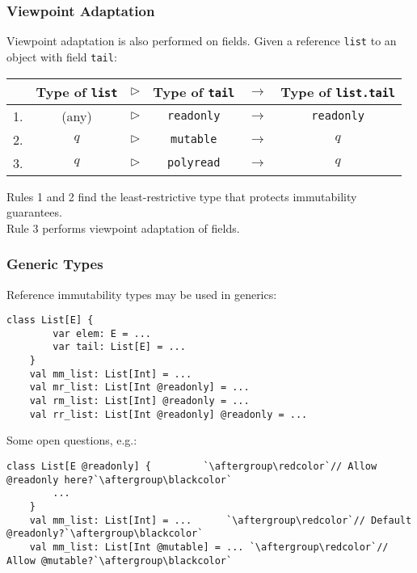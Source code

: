 \documentclass{beamer}
\newcommand{\code}[1]{\lstinline$#1$}
\begin{document}
\begin{frame}[containsverbatim]   %
\frametitle{Viewpoint Adaptation}
Viewpoint adaptation is also performed on fields.
Given a reference \code{list} to an object with field \code{tail}:
\begin{center}
\begin{tabular}{cccccc}
	& {\small Type of }\code{list} & $\triangleright$ & {\small Type of }\code{tail} & $\rightarrow$ & {\small Type of }\code{list.tail} \\
	\hline
	1. & (any) & $\triangleright$ & \code{readonly} & $\rightarrow$ & \code{readonly} \\
	2. & $q$ & $\triangleright$ & \code{mutable} & $\rightarrow$ & $q$ \\
	3. & $q$ & $\triangleright$ & \code{polyread} & $\rightarrow$ & $q$ \\
\end{tabular}
\end{center}
Rules 1 and 2 find the least-restrictive type that protects immutability guarantees.\\
Rule 3 performs viewpoint adaptation of fields.
\end{frame}

\begin{frame}[containsverbatim]   %
\frametitle{Generic Types}
Reference immutability types may be used in generics:
\begin{lstlisting}[escapechar=`]
	class List[E] {
		var elem: E = ...
		var tail: List[E] = ...
	}
	val mm_list: List[Int] = ...
	val mr_list: List[Int @readonly] = ...
	val rm_list: List[Int] @readonly = ...
	val rr_list: List[Int @readonly] @readonly = ...
\end{lstlisting}
Some open questions, e.g.:
\begin{lstlisting}[escapechar=`]
	class List[E @readonly] {         `\aftergroup\redcolor`// Allow @readonly here?`\aftergroup\blackcolor`
		...
	}
	val mm_list: List[Int] = ...      `\aftergroup\redcolor`// Default @readonly?`\aftergroup\blackcolor`
	val mm_list: List[Int @mutable] = ... `\aftergroup\redcolor`// Allow @mutable?`\aftergroup\blackcolor`
\end{lstlisting}
\end{frame}
\end{document}
